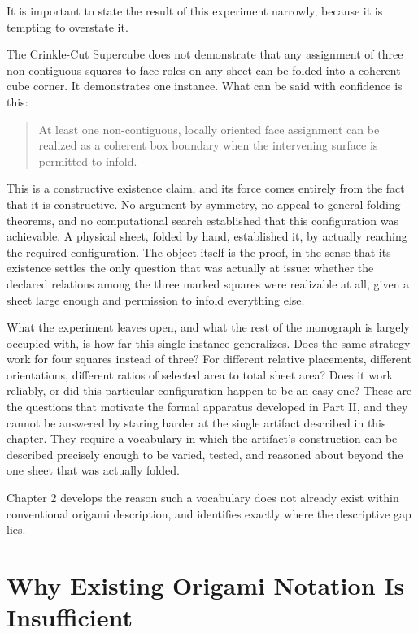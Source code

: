 \documentclass[11pt,oneside]{book}
\begin{document}
It is important to state the result of this experiment narrowly, because
it is tempting to overstate it.

The Crinkle-Cut Supercube does not demonstrate that any assignment of
three non-contiguous squares to face roles on any sheet can be folded
into a coherent cube corner. It demonstrates one instance. What can be
said with confidence is this:

\begin{quote}
At least one non-contiguous, locally oriented face assignment can be
realized as a coherent box boundary when the intervening surface is
permitted to infold.
\end{quote}

This is a constructive existence claim, and its force comes entirely
from the fact that it is constructive. No argument by symmetry, no
appeal to general folding theorems, and no computational search
established that this configuration was achievable. A physical sheet,
folded by hand, established it, by actually reaching the required
configuration. The object itself is the proof, in the sense that its
existence settles the only question that was actually at issue: whether
the declared relations among the three marked squares were realizable at
all, given a sheet large enough and permission to infold everything
else.

What the experiment leaves open, and what the rest of the monograph is
largely occupied with, is how far this single instance generalizes. Does
the same strategy work for four squares instead of three? For different
relative placements, different orientations, different ratios of
selected area to total sheet area? Does it work reliably, or did this
particular configuration happen to be an easy one? These are the
questions that motivate the formal apparatus developed in Part II, and
they cannot be answered by staring harder at the single artifact
described in this chapter. They require a vocabulary in which the
artifact's construction can be described precisely enough to be varied,
tested, and reasoned about beyond the one sheet that was actually
folded.

Chapter 2 develops the reason such a vocabulary does not already exist
within conventional origami description, and identifies exactly where
the descriptive gap lies.

\hypertarget{chapter-2.-why-existing-origami-notation-is-insufficient}{%
\chapter{Why Existing Origami Notation Is
Insufficient}\label{chapter-2.-why-existing-origami-notation-is-insufficient}}
\end{document}
